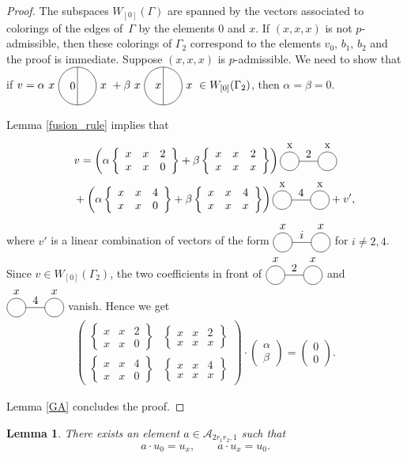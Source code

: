 \documentclass[11pt]{article}
\newcommand{\eyesgraph}[3]{
\tikz[scale=0.3,baseline=-0.5ex]{
\draw (0,0) circle (1);
\draw (4,0) circle (1);
\draw (1,0) -- (3,0);
\draw (0,1) node[above]{#1};
\draw (2,0) node[above]{#2};
\draw (4,1) node[above]{#3};
}}
\newcommand{\thetagraph}[3]{
\tikz[scale=0.3,baseline=-0.5ex]{
\draw (0,0) circle (2);
\draw (0,2)--(0,-2);
\draw (-2,0) node[left]{#1};
\draw (0.2,0) node[left]{#2};
\draw (2,0) node[right]{#3};
}
}
\newcommand{\sixj}[6]{
\left\{
\begin{array}{ccc}
#1 & #2 & #3 \\ #4 & #5 & #6
\end{array}
\right\}
}
\numberwithin{equation}{section}
\newtheorem{Lemma}[Theorem]{Lemma}
\begin{document}
\begin{proof}The subspaces $W_{[0]}(\Gamma)$ are spanned by the vectors associated to colorings of the edges of~$\Gamma$ by the elements $0$ and $x$. If $(x,x,x)$ is not $p$-admissible, then these colorings of $\Gamma_2$ correspond to the elements $v_0$, $b_1$, $b_2$ and the proof is immediate. Suppose $(x,x,x)$ is $p$-admissible. We need to show that if $v=\alpha \thetagraph{$x$}{0}{$x$} + \beta \thetagraph{$x$}{$x$}{$x$} \in W_{[0]}(\Gamma_2)$, then $\alpha=\beta = 0$.

Lemma \ref{fusion_rule} implies that
\begin{gather*}
v= \left( \alpha \sixj{x}{x}{2}{x}{x}{0} +\beta \sixj{x}{x}{2}{x}{x}{x} \right) \eyesgraph{x}{2}{x}\\
\hphantom{v=}{}+ \left( \alpha \sixj{x}{x}{4}{x}{x}{0} +\beta \sixj{x}{x}{4}{x}{x}{x} \right) \eyesgraph{x}{4}{x} + v',
\end{gather*}
where $v'$ is a linear combination of vectors of the form $\eyesgraph{$x$}{$i$}{$x$}$ for $i\neq 2,4$. Since $v\in W_{[0]}(\Gamma_2)$, the two coefficients in front of $\eyesgraph{$x$}{2}{$x$}$ and $\eyesgraph{$x$}{4}{$x$}$ vanish. Hence we get
\begin{gather*}\begin{pmatrix} \sixj{x}{x}{2}{x}{x}{0} & \sixj{x}{x}{2}{x}{x}{x} \\ \sixj{x}{x}{4}{x}{x}{0} & \sixj{x}{x}{4}{x}{x}{x} \end{pmatrix} \cdot \begin{pmatrix} \alpha \\ \beta \end{pmatrix} = \begin{pmatrix} 0\\0 \end{pmatrix}.\end{gather*}

Lemma \ref{GA} concludes the proof.
\end{proof}

\begin{Lemma}\label{lemmalacon}
There exists an element $a \in \mathcal{A}_{2r_1r_2,1}$ such that
\begin{gather*}
a\cdot u_0 = u_x, \qquad a \cdot u_x = u_0.
\end{gather*}
\end{Lemma}
\end{document}
